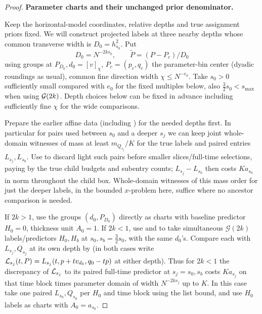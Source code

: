 \begin{proof}
\par\smallskip\noindent\textbf{Parameter charts and their unchanged prior denominator.}\quad


Keep the horizontal-model coordinates, relative depths and true
assignment priors fixed. We will construct projected labels at three
nearby depths whose common transverse width is
\(D_0=h_{s_0}^2\). Put
\[
 D_0=N^{-2k s_0},\qquad \widetilde P=(P-P_c)/D_0
\]
using groups at \(P_{D_0}, d_0=[v]_\chi\), \(P_c=(p_c,q_c)\) the parameter-bin center (dyadic roundings as usual), common fine direction width \(\chi\le N^{-e_0}\). Take \(s_0>0\) sufficiently small compared with \(e_0\) for the fixed multiples below, also \(\tfrac32s_0<s_{\max}\) when using \({\cal G}(2k)\). Depth choices below can be fixed in advance including sufficiently fine \(\chi\) for the wide comparisons.

Prepare the earlier affine data (including ) for the needed depths first. In particular for pairs used between \(s_0\) and a deeper \(s_j\) we can keep joint whole-domain witnesses of mass at least \(m_{Q_{s_j}}/K\) for the true labels and paired entries \(L_{s_j},L_{s_0}\). Use  to discard light such pairs before smaller slices/full-time selections, paying by the true child budgets and subentry counts; \(L_{s_j}-L_{s_0}\) then costs \(K a_{s_0}\) in norm throughout the child box. Whole-domain witnesses of this mass order for just the deeper labels, in the bounded \(x\)-problem here, suffice where no ancestor comparison is needed.

If \(2k>1\), use the groups \((d_0,P_{D_0})\) directly as charts with baseline predictor \(H_0=0\), thickness unit \(A_0=1\). If \(2k<1\), use  and  to take simultaneous \(\mathcal G(2k)\) labels/predictors \(H_0,H_b\) at \(s_0,s_b=\tfrac32s_0\), with the same \(d_0\)'s. Compare each with \(L_{s_j},Q_{s_j}\) at its own depth by  (in both cases write \({\cal L}_{s_j}(t,P)=L_{s_j}(t,p+t v_{d_0},q_0-tp)\) at either depth). Thus for \(2k<1\) the discrepancy of \({\cal L}_{s_j}\) to its paired full-time predictor at \(s_j=s_0,s_b\) costs \(K a_{s_j}\) on that time block times parameter domain of width \(N^{-2ks_j}\) up to \(K\). In this case take one paired \(L_{s_0},Q_{s_0}\) per \(H_0\) and time block using the list bound, and use \(H_0\) labels as charts with \(A_0=a_{s_0}\).


\end{proof}
